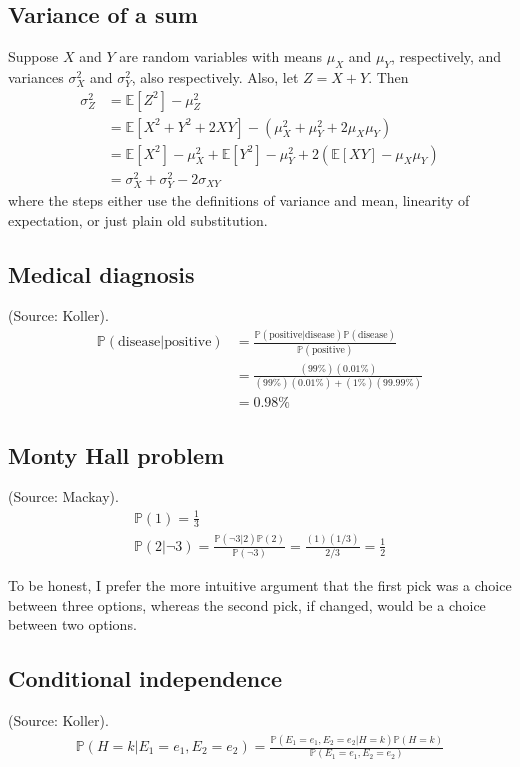 \documentclass{article}
\begin{document}
\subsection{Variance of a sum}
Suppose $X$ and $Y$ are random variables with means $\mu_X$ and $\mu_Y$, respectively, and variances $\sigma_X^2$ and $\sigma_Y^2$, also respectively. Also, let $Z = X + Y$. Then
\begin{align*}
\sigma_Z^2 &= \mathbb{E}[Z^2] - \mu_Z^2\\
&= \mathbb{E}[X^2 + Y^2 + 2XY] - (\mu_X^2 + \mu_Y^2 + 2\mu_X\mu_Y)\\
&= \mathbb{E}[X^2] - \mu_X^2 + \mathbb{E}[Y^2] - \mu_Y^2 + 2(\mathbb{E}[XY] - \mu_X\mu_Y)\\
&= \sigma_X^2 + \sigma_Y^2 - 2\sigma_{XY}
\end{align*}
where the steps either use the definitions of variance and mean, linearity of expectation, or just plain old substitution.

\subsection{Medical diagnosis}
(Source: Koller).
\begin{align*}
\mathbb{P}(\mathrm{disease}|\mathrm{positive}) &= \frac{\mathbb{P}(\mathrm{positive}|\mathrm{disease}) \mathbb{P}(\mathrm{disease})}{\mathbb{P}(\mathrm{positive})}\\
&= \frac{(99\%)(0.01\%)}{(99\%)(0.01\%)+(1\%)(99.99\%)}\\ &= 0.98\%
\end{align*}

\subsection{Monty Hall problem}
(Source: Mackay).
\begin{gather*}
\mathbb{P}(1) = \frac{1}{3}\\
\mathbb{P}(2|\neg 3) = \frac{\mathbb{P}(\neg 3|2)\mathbb{P}(2)}{\mathbb{P}(\neg 3)} = \frac{(1)(1/3)}{2/3} = \frac{1}{2}
\end{gather*}

To be honest, I prefer the more intuitive argument that the first pick was a choice between three options, whereas the second pick, if changed, would be a choice between two options.

\subsection{Conditional independence}
(Source: Koller).
\begin{gather*}
\mathbb{P}(H=k|E_1=e_1,E_2=e_2) = \frac{\mathbb{P}(E_1=e_1,E_2=e_2|H=k)\mathbb{P}(H=k)}{\mathbb{P}(E_1=e_1,E_2=e_2)}
\end{gather*}
\end{document}
